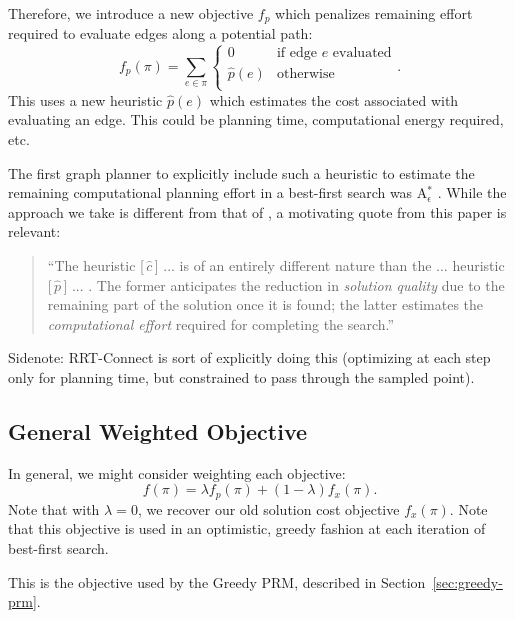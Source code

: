 \documentclass{report}
\begin{document}
Therefore, we introduce a new objective $f_p$
which penalizes remaining effort required to evaluate edges
along a potential path:
\begin{equation}
   f_p(\pi) = \sum_{e \in \pi} \left\{
   \begin{array}{cl}
      0 & \mbox{if edge } e \mbox{ evaluated}  \\
      \hat{p}(e) & \mbox{otherwise} \\
   \end{array}
   \right.
   .
\end{equation}
This uses a new heuristic $\hat{p}(e)$ which estimates the cost
associated with evaluating an edge.
This could be planning time, computational energy required, etc.

The first graph planner to explicitly include such a heuristic
to estimate the remaining
computational planning effort in a best-first search
was A$_\epsilon^*$ \cite{pearl1982semiadmissible}.
While the approach we take is different from that of
\cite{pearl1982semiadmissible},
a motivating quote from this paper is relevant:
\begin{quote}
``The heuristic [\,$\hat{c}$\,] ... is of an entirely
different nature than the ... heuristic [\,$\hat{p}$\,] ... .
The former anticipates the reduction in \emph{solution quality} due to the
remaining part of the solution once it is found;
the latter estimates the \emph{computational effort}
required for completing the search.''
\end{quote}

Sidenote: RRT-Connect is sort of explicitly doing this
(optimizing at each step only for planning time,
but constrained to pass through the sampled point).

\subsection{General Weighted Objective}

In general, we might consider weighting each objective:
\begin{equation}
   f(\pi) = \lambda f_p(\pi) + (1 - \lambda) f_x(\pi) .
   \label{eqn:general-objective}
\end{equation}
Note that with $\lambda=0$,
we recover our old solution cost objective $f_x(\pi)$.
Note that this objective is used in an optimistic, greedy fashion at each
iteration of best-first search.

This is the objective used by the Greedy PRM,
described in Section~\ref{sec:greedy-prm}.
\end{document}
